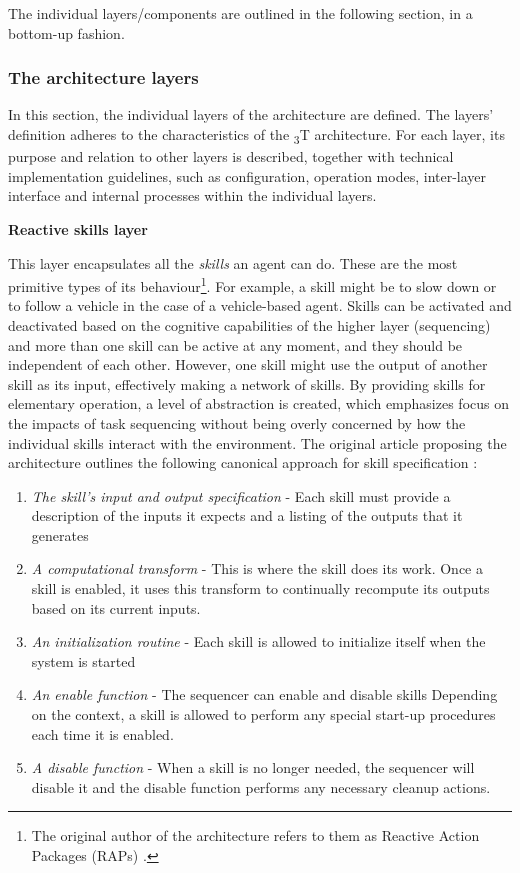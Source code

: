 \documentclass[0main.tex]{subfiles}
\begin{document}
The individual layers/components are outlined in the following section, in a bottom-up
fashion.

\subsubsection{The architecture layers}

In this section, the individual layers of the architecture are defined. The layers' definition 
adheres to the characteristics of the \textsubscript{3}T architecture. For each layer, its purpose and 
relation to other layers is described, together with technical implementation guidelines, such as 
configuration, operation modes, inter-layer interface and internal processes within the individual layers.

\textbf{Reactive skills layer}

This layer encapsulates all the \emph{skills} an agent can do. These are the 
most primitive types of its behaviour\footnote{The original author of the architecture refers to them 
as Reactive Action Packages (RAPs) \cite{Firby1987}.}. For example, a skill might be to slow
down or to follow a vehicle in the case of a vehicle-based agent. Skills can be activated and deactivated based 
on the cognitive capabilities of the higher layer (sequencing) and more than one skill can be active at 
any moment, and they should be independent of each other. However, one skill might use the output of another 
skill as its input, effectively making a network of skills. By providing skills for elementary operation,
a level of abstraction is created, which emphasizes focus on the impacts of task sequencing without being 
overly concerned by how the individual skills interact with the environment. The original article 
proposing the architecture outlines the following canonical approach for skill specification
\cite{Bonasso1995}:

\begin{enumerate}
    \item \emph{The skill's input and output specification} - Each skill must provide a
description of the inputs it expects and a listing of the outputs that it
generates 
    \item \emph{A computational transform} - This is where the skill does its work. Once a
skill is enabled, it uses this transform to continually recompute its outputs
based on its current inputs.
    \item \emph{An initialization routine} - Each skill is allowed to initialize itself when the system is started 
    \item \emph{An enable function} - The sequencer can enable and disable skills Depending on the
    context, a skill is allowed to perform any special start-up procedures each
    time it is enabled.
    \item \emph{A disable function} - When a skill is no longer needed, the sequencer will disable it
    and the disable function performs any necessary cleanup actions.
\end{enumerate}
\end{document}
